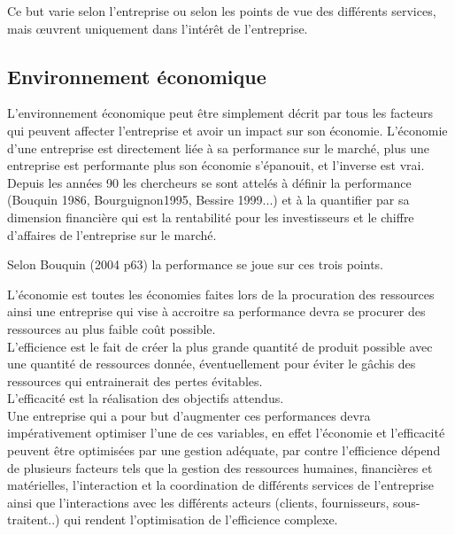         Ce but varie selon l’entreprise ou selon les points de vue des différents services, mais œuvrent uniquement dans l’intérêt de l’entreprise.

    \subsection{Environnement économique}
        L’environnement économique peut être simplement décrit par tous les facteurs qui peuvent affecter l’entreprise et avoir un impact sur son économie. 
        L’économie d’une entreprise est directement liée à sa performance sur le marché, plus une entreprise est performante plus son économie s’épanouit, et l’inverse est vrai.\\

        Depuis les années 90 les chercheurs se sont attelés à définir la performance (Bouquin 1986, Bourguignon1995, Bessire 1999...) et à la quantifier par sa dimension financière qui est la rentabilité pour les investisseurs et le chiffre d’affaires de l’entreprise sur le marché.

        Selon Bouquin (2004 p63) la performance se joue sur ces trois points.

        L’économie est toutes les économies faites lors de la procuration des ressources ainsi une entreprise qui vise à accroitre sa performance devra se procurer des ressources au plus faible coût possible.\\

        L’efficience est le fait de créer la plus grande quantité de produit possible avec une quantité de ressources donnée, éventuellement pour éviter le gâchis des ressources qui entrainerait des pertes évitables.\\

        L’efficacité est la réalisation des objectifs attendus. \\

        Une entreprise qui a pour but d’augmenter ces performances devra impérativement optimiser l’une de ces variables, en effet l’économie et l’efficacité peuvent être optimisées par une gestion adéquate, par contre l’efficience dépend de plusieurs facteurs tels que la gestion des ressources humaines, financières et matérielles, l’interaction et la coordination de différents services de l’entreprise ainsi que l’interactions avec les différents acteurs (clients, fournisseurs, sous-traitent..) qui rendent l’optimisation de l’efficience complexe.\\

